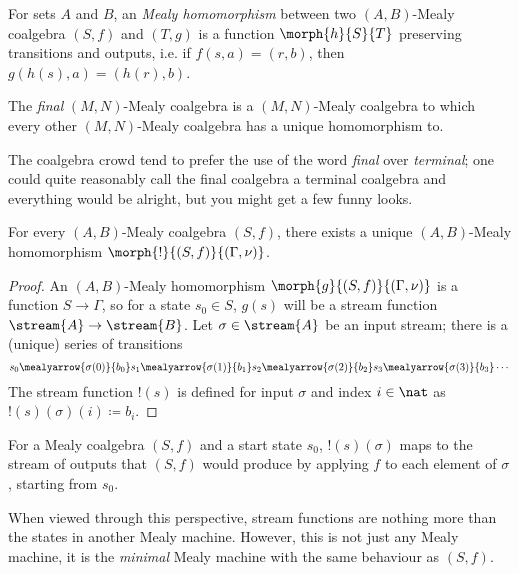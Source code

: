 \begin{definition}\label{def:mealy-homomorphism}
    For sets \(A\) and \(B\), an \emph{Mealy homomorphism} between two
    \((A,B)\)-Mealy coalgebra \((S,f)\) and \((T,g)\) is a function
    \(\morph{h}{S}{T}\) preserving transitions and
    outputs, i.e. if \(f(s,a) = (r,b)\), then \(g(h(s),a) = (h(r),b)\).
\end{definition}

The \emph{final} \((M,N)\)-Mealy coalgebra is a \((M,N)\)-Mealy coalgebra to
which every other \((M,N)\)-Mealy coalgebra has a unique homomorphism to.

\begin{remark}
    The coalgebra crowd tend to prefer the use of the word \emph{final} over
    \emph{terminal}; one could quite reasonably call the final coalgebra a
    terminal coalgebra and everything would be alright, but you might get a few
    funny looks.
\end{remark}

\begin{proposition}
    \label{prop:final-coalgebra}
    For every \((A,B)\)-Mealy coalgebra \((S,f)\), there exists a
    unique \((A,B)\)-Mealy homomorphism \(\morph{{!}}{(S,f)}{(\Gamma,\nu)}\).
\end{proposition}
\begin{proof}
    An \((A,B)\)-Mealy homomorphism \(\morph{g}{(S, f)}{(\Gamma, \nu)}\) is a
    function \(S \to \Gamma\), so for a state \(s_0 \in S\), \(g(s)\) will be a
    stream function \(\stream{A} \to \stream{B}\).
    Let \(\sigma \in \stream{A}\) be an input stream; there is a (unique) series
    of transitions \[
        s_0
        \mealyarrow{\sigma(0)}{b_0}
        s_1
        \mealyarrow{\sigma(1)}{b_1}
        s_2
        \mealyarrow{\sigma(2)}{b_2}
        s_3
        \mealyarrow{\sigma(3)}{b_3}
        \cdots
    \]
    The stream function \(!(s)\) is defined for input \(\sigma\) and
    index \(i \in \nat\) as \(!(s)(\sigma)(i) \coloneqq b_i\).
\end{proof}

For a Mealy coalgebra \((S, f)\) and a start state \(s_0\),
\(!(s)(\sigma)\) maps to the stream of outputs that \((S, f)\) would produce
by applying \(f\) to each element of \(\sigma\), starting from \(s_0\).

When viewed through this perspective, stream functions are nothing more than the
states in another Mealy machine.
However, this is not just any Mealy machine, it is the \emph{minimal} Mealy
machine with the same behaviour as \((S, f)\).

